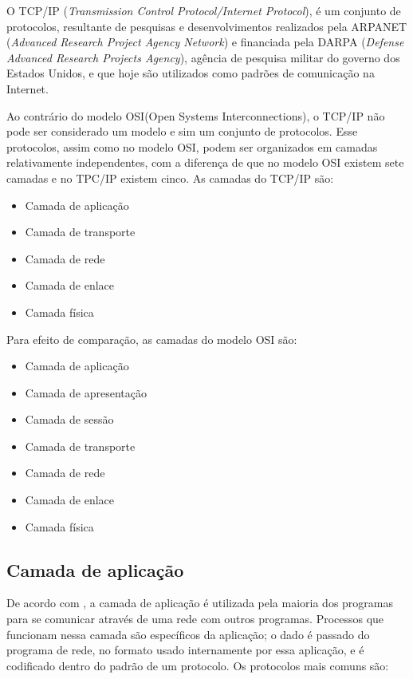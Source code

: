 O TCP/IP (\textit{Transmission Control Protocol/Internet Protocol}), é um 
conjunto de protocolos, resultante de pesquisas e desenvolvimentos realizados 
pela ARPANET (\textit{Advanced Research Project Agency Network}) e financiada 
pela DARPA (\textit{Defense Advanced Research Projects Agency}), agência de 
pesquisa militar do governo dos Estados Unidos, e que hoje são utilizados como 
padrões de comunicação na Internet.

Ao contrário do modelo OSI(Open Systems Interconnections), o TCP/IP não pode 
ser considerado um modelo e sim um conjunto de protocolos. Esse protocolos, 
assim como no modelo OSI, podem ser organizados em camadas relativamente 
independentes, com a diferença de que no modelo OSI existem sete camadas e no 
TPC/IP existem cinco. As camadas do TCP/IP são:

\begin{itemize}
	\item Camada de aplicação
	\item Camada de transporte
	\item Camada de rede
	\item Camada de enlace
	\item Camada física
\end{itemize}

Para efeito de comparação, as camadas do modelo OSI são:

\begin{itemize}
	\item Camada de aplicação
	\item Camada de apresentação
	\item Camada de sessão
	\item Camada de transporte
	\item Camada de rede
	\item Camada de enlace
	\item Camada física
\end{itemize}

\subsection{Camada de aplicação}

De acordo com , a camada de aplicação é utilizada 
pela maioria dos programas para se comunicar através de uma rede com outros 
programas. Processos que 
funcionam nessa camada são específicos da aplicação; o dado é passado do 
programa de rede, no formato usado internamente por essa aplicação, e é 
codificado dentro do padrão de um protocolo. Os protocolos mais comuns são:

